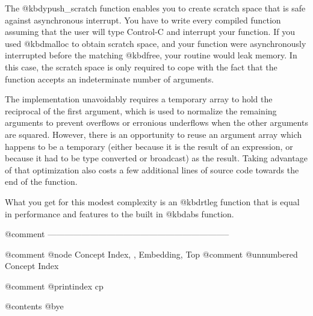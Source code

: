 The @kbd{ypush_scratch} function enables you to create scratch space
that is safe against asynchronous interrupt.  You have to write every
compiled function assuming that the user will type Control-C and
interrupt your function.  If you used @kbd{malloc} to obtain scratch
space, and your function were asynchronously interrupted before the
matching @kbd{free}, your routine would leak memory.  In this case,
the scratch space is only required to cope with the fact that the
function accepts an indeterminate number of arguments.

The implementation unavoidably requires a temporary array to hold the
reciprocal of the first argument, which is used to normalize the
remaining arguments to prevent overflows or erronious underflows when
the other arguments are squared.  However, there is an opportunity to
reuse an argument array which happens to be a temporary (either
because it is the result of an expression, or because it had to be
type converted or broadcast) as the result.  Taking advantage of that
optimization also costs a few additional lines of source code towards
the end of the function.

What you get for this modest complexity is an @kbd{rtleg} function
that is equal in performance and features to the built in @kbd{abs}
function.

@comment -----------------------------------------------------------------

@comment @node    Concept Index,  , Embedding, Top
@comment @unnumbered Concept Index

@comment @printindex cp

@contents
@bye
